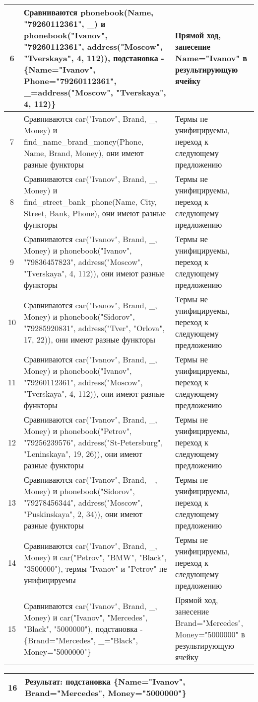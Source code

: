 \documentclass[a4paper,12pt]{article}
\begin{document}
\begin{table}[ht!] 
	\begin{tabularx}{\linewidth}{|c|>{\centering}X|>{\centering}X|}
		\hline
		6 & Сравниваются phonebook(Name, "79260112361"{}, \_) и phonebook("Ivanov"{}, "79260112361"{}, address("Moscow"{}, "Tverskaya"{}, 4, 112)), подстановка - \{Name="Ivanov"{}, Phone="79260112361"{}, \_=address("Moscow"{}, "Tverskaya"{}, 4, 112)\} & Прямой ход, занесение Name="Ivanov" в результирующую ячейку \tabularnewline
		\hline
		7 & Сравниваются car("Ivanov"{}, Brand, \_, Money) и find\_name\_brand\_money(Phone, Name, Brand, Money), они имеют разные функторы & Термы не унифицируемы, переход к следующему предложению \tabularnewline
		\hline
		8 & Сравниваются car("Ivanov"{}, Brand, \_, Money) и find\_street\_bank\_phone(Name, City, Street, Bank, Phone), они имеют разные функторы & Термы не унифицируемы, переход к следующему предложению \tabularnewline
		\hline
		9 & Сравниваются car("Ivanov"{}, Brand, \_, Money) и phonebook("Ivanov"{}, "79836457823"{}, address("Moscow"{}, "Tverskaya"{}, 4, 112)), они имеют разные функторы & Термы не унифицируемы, переход к следующему предложению \tabularnewline
		\hline
		10 & Сравниваются car("Ivanov"{}, Brand, \_, Money) и phonebook("Sidorov"{}, "79285920831"{}, address("Tver"{}, "Orlova"{}, 17, 22)), они имеют разные функторы & Термы не унифицируемы, переход к следующему предложению\tabularnewline
		\hline
		11 & Сравниваются car("Ivanov"{}, Brand, \_, Money) и phonebook("Ivanov"{}, "79260112361"{}, address("Moscow"{}, "Tverskaya"{}, 4, 112)), они имеют разные функторы & Термы не унифицируемы, переход к следующему предложению\tabularnewline
		\hline
		12 & Сравниваются car("Ivanov"{}, Brand, \_, Money) и  phonebook("Petrov"{}, "79256239576"{}, address("St-Petersburg"{}, "Leninskaya"{}, 19, 26)), они имеют разные функторы & Термы не унифицируемы, переход к следующему предложению\tabularnewline
		\hline
		13 & Сравниваются car("Ivanov"{}, Brand, \_, Money) и  phonebook("Sidorov"{}, "79278456344"{}, address("Moscow"{}, "Puskinskaya"{}, 2, 34)), они имеют разные функторы & Термы не унифицируемы, переход к следующему предложению\tabularnewline
		\hline
		14 & Сравниваются car("Ivanov"{}, Brand, \_, Money) и car("Petrov"{}, "BMW"{}, "Black"{}, "3500000"), термы "Ivanov" и "Petrov" не унифицируемы & Термы не унифицируемы, переход к следующему предложению \tabularnewline
		\hline
		15 & Сравниваются car("Ivanov"{}, Brand, \_, Money) и car("Ivanov"{}, "Mercedes"{}, "Black"{}, "5000000"), подстановка - \{Brand="Mercedes"{}, \_="Black"{}, Money="5000000"\} & Прямой ход, занесение Brand="Mercedes"{}, Money="5000000" в результирующую ячейку \tabularnewline
		\hline
	\end{tabularx}
\end{table}
\newpage
\begin{table}[ht!] 
	\begin{tabularx}{\linewidth}{|c|>{\centering}X|>{\centering}X|}
		\hline
		16 & Результат: подстановка \{Name="Ivanov"{}, Brand="Mercedes"{}, Money="5000000"\} &  \tabularnewline
		\hline
	\end{tabularx}
\end{table}	
\end{document}
